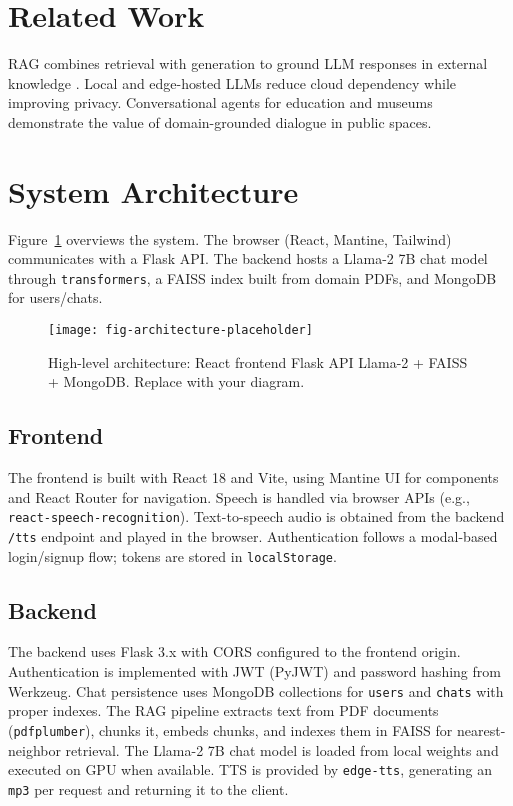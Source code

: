 \documentclass[conference]{IEEEtran}
\begin{document}
\section{Related Work}
RAG combines retrieval with generation to ground LLM responses in external knowledge \cite{rag_lewis2020}. Local and edge-hosted LLMs reduce cloud dependency while improving privacy. Conversational agents for education and museums demonstrate the value of domain-grounded dialogue in public spaces.

\section{System Architecture}
Figure~\ref{fig:arch} overviews the system. The browser (React, Mantine, Tailwind) communicates with a Flask API. The backend hosts a Llama-2 7B chat model through \texttt{transformers}, a FAISS index built from domain PDFs, and MongoDB for users/chats.

\begin{figure}[t]
  \centering
  \texttt{[image: fig-architecture-placeholder]}
  \caption{High-level architecture: React frontend \textleftrightarrow{} Flask API \textleftrightarrow{} Llama-2 + FAISS + MongoDB. Replace with your diagram.}
  \label{fig:arch}
\end{figure}

\subsection{Frontend}
The frontend is built with React 18 and Vite, using Mantine UI for components and React Router for navigation. Speech is handled via browser APIs (e.g., \texttt{react-speech-recognition}). Text-to-speech audio is obtained from the backend \texttt{/tts} endpoint and played in the browser. Authentication follows a modal-based login/signup flow; tokens are stored in \texttt{localStorage}.

\subsection{Backend}
The backend uses Flask 3.x with CORS configured to the frontend origin. Authentication is implemented with JWT (PyJWT) and password hashing from Werkzeug. Chat persistence uses MongoDB collections for \texttt{users} and \texttt{chats} with proper indexes. The RAG pipeline extracts text from PDF documents (\texttt{pdfplumber}), chunks it, embeds chunks, and indexes them in FAISS for nearest-neighbor retrieval. The Llama-2 7B chat model is loaded from local weights and executed on GPU when available. TTS is provided by \texttt{edge-tts}, generating an \texttt{mp3} per request and returning it to the client.
\end{document}

